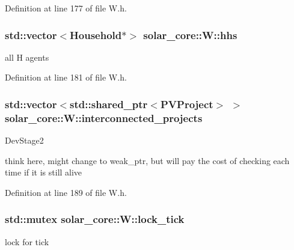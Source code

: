 Definition at line 177 of file W.\+h.

\hypertarget{classsolar__core_1_1_w_a17c012ff8b17890ed33923cec6d87be3}{}
\subsubsection[{hhs}]{\setlength{\rightskip}{0pt plus 5cm}std\+::vector$<${\bf Household}$\ast$$>$ solar\+\_\+core\+::\+W\+::hhs\hspace{0.3cm}{\ttfamily [protected]}}\label{classsolar__core_1_1_w_a17c012ff8b17890ed33923cec6d87be3}
all H agents 

Definition at line 181 of file W.\+h.

\hypertarget{classsolar__core_1_1_w_a1d35d6501eef6d673bd2b28e2c1724c4}{}
\subsubsection[{interconnected\+\_\+projects}]{\setlength{\rightskip}{0pt plus 5cm}std\+::vector$<$std\+::shared\+\_\+ptr$<${\bf P\+V\+Project}$>$ $>$ solar\+\_\+core\+::\+W\+::interconnected\+\_\+projects\hspace{0.3cm}{\ttfamily [protected]}}\label{classsolar__core_1_1_w_a1d35d6501eef6d673bd2b28e2c1724c4}
\begin{DoxyRefDesc}{Dev\+Stage2}
\item[\hyperlink{_dev_stage2__DevStage2000029}{Dev\+Stage2}]think here, might change to weak\+\_\+ptr, but will pay the cost of checking each time if it is still alive \end{DoxyRefDesc}


Definition at line 189 of file W.\+h.

\hypertarget{classsolar__core_1_1_w_a56ba20ee51f5db7288e55bb65f12511b}{}
\subsubsection[{lock\+\_\+tick}]{\setlength{\rightskip}{0pt plus 5cm}std\+::mutex solar\+\_\+core\+::\+W\+::lock\+\_\+tick}\label{classsolar__core_1_1_w_a56ba20ee51f5db7288e55bb65f12511b}
lock for tick 

